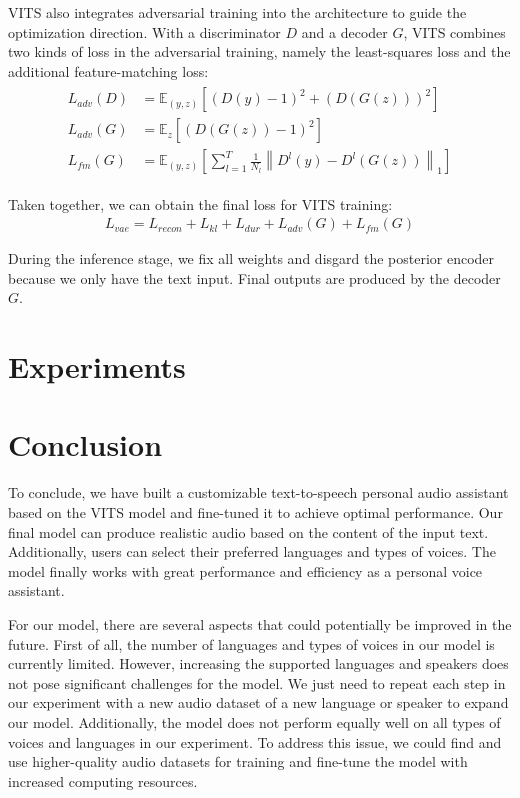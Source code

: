 \documentclass{article}
\begin{document}
VITS also integrates adversarial training into the architecture to guide the optimization direction. With a discriminator $D$ and a decoder $G$, VITS combines two kinds of loss in the adversarial training, namely the least-squares loss and the additional feature-matching loss:
\begin{align}
    \begin{split}
        L_{a d v}(D) & =\mathbb{E}_{(y, z)}\left[(D(y)-1)^{2}+(D(G(z)))^{2}\right] \\
        L_{a d v}(G) & =\mathbb{E}_{z}\left[(D(G(z))-1)^{2}\right] \\
        L_{f m}(G) & =\mathbb{E}_{(y, z)}\left[\sum_{l=1}^{T} \frac{1}{N_{l}}\left\|D^{l}(y)-D^{l}(G(z))\right\|_{1}\right]
    \end{split}
\end{align}

Taken together, we can obtain the final loss for VITS training:
\begin{align}
    L_{v a e}=L_{r e c o n}+L_{k l}+L_{d u r}+L_{a d v}(G)+L_{f m}(G)
\end{align}

During the inference stage, we fix all weights and disgard the posterior encoder because we only have the text input. Final outputs are produced by the decoder $G$.

\section{Experiments}
\label{sec:exper}

\section{Conclusion}
To conclude, we have built a customizable text-to-speech personal audio assistant based on the VITS model and fine-tuned it to achieve optimal performance. Our final model can produce realistic audio based on the content of the input text. Additionally, users can select their preferred languages and types of voices. The model finally works with great performance and efficiency as a personal voice assistant.

For our model, there are several aspects that could potentially be improved in the future. First of all, the number of languages and types of voices in our model is currently limited. However, increasing the supported languages and speakers does not pose significant challenges for the model. We just need to repeat each step in our experiment with a new audio dataset of a new language or speaker to expand our model. Additionally, the model does not perform equally well on all types of voices and languages in our experiment. To address this issue, we could find and use higher-quality audio datasets for training and fine-tune the model with increased computing resources.
\label{sec:con}



  
 
\end{document}
